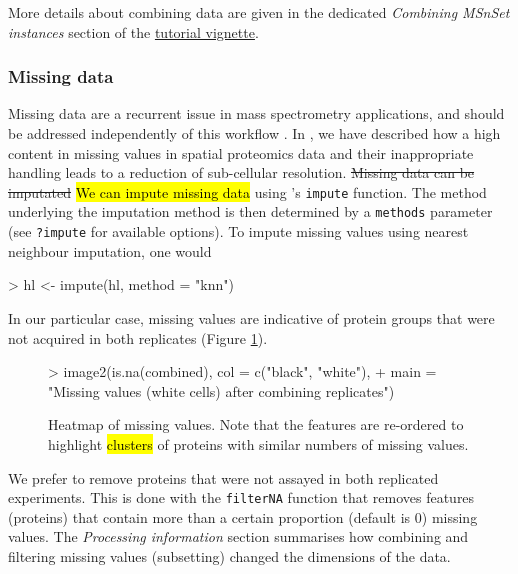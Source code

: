 More details about combining data are given in the dedicated
\textit{Combining MSnSet instances} section of the 
\href{http://bioconductor.org/packages/release/bioc/vignettes/MSnbase/inst/doc/MSnbase-demo.pdf}{tutorial
  vignette}.

\subsubsection*{Missing data}

Missing data are a recurrent issue in mass spectrometry applications,
and should be addressed independently of this workflow
\cite{Webb-Robertson:2015,Lazar:2016}. In \cite{Gatto:2014b}, we have
described how a high content in missing values in spatial proteomics
data and their inappropriate handling leads to a reduction of
sub-cellular resolution. \sout{Missing data can be imputated} \hl{We can impute missing data} using
's \texttt{impute} function. The method underlying
the imputation method is then determined by a \texttt{methods}
parameter (see \texttt{?impute} for available options). To impute
missing values using nearest neighbour imputation, one would

\begin{Schunk}
\begin{Sinput}
> hl <- impute(hl, method = "knn")
\end{Sinput}
\end{Schunk}

In our particular case, missing values are indicative of protein
groups that were not acquired in both replicates (Figure
\ref{fig:namap}).

\begin{figure}[!ht]
  \centering
\begin{Schunk}
\begin{Sinput}
> image2(is.na(combined), col = c("black", "white"),
+        main = "Missing values (white cells) after combining replicates")
\end{Sinput}
\end{Schunk}
\caption{Heatmap of missing values. Note that the features are
  re-ordered to highlight \hl{clusters} of proteins with similar numbers of
  missing values.}
  \label{fig:namap}
\end{figure}

We prefer to remove proteins that were not assayed in both replicated
experiments. This is done with the \texttt{filterNA} function that
removes features (proteins) that contain more than a certain
proportion (default is 0) missing values. The \textit{Processing
  information} section summarises how combining and filtering missing
values (subsetting) changed the dimensions of the data.


